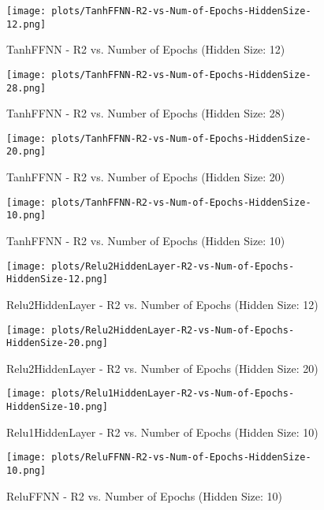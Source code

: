 
\begin{figure}[H]
    \centering
    \texttt{[image: plots/TanhFFNN-R2-vs-Num-of-Epochs-HiddenSize-12.png]}
    \caption{TanhFFNN - R2 vs. Number of Epochs (Hidden Size: 12)}
\end{figure}

\begin{figure}[H]
    \centering
    \texttt{[image: plots/TanhFFNN-R2-vs-Num-of-Epochs-HiddenSize-28.png]}
    \caption{TanhFFNN - R2 vs. Number of Epochs (Hidden Size: 28)}
\end{figure}

\begin{figure}[H]
    \centering
    \texttt{[image: plots/TanhFFNN-R2-vs-Num-of-Epochs-HiddenSize-20.png]}
    \caption{TanhFFNN - R2 vs. Number of Epochs (Hidden Size: 20)}
\end{figure}

\begin{figure}[H]
    \centering
    \texttt{[image: plots/TanhFFNN-R2-vs-Num-of-Epochs-HiddenSize-10.png]}
    \caption{TanhFFNN - R2 vs. Number of Epochs (Hidden Size: 10)}
\end{figure}

\begin{figure}[H]
    \centering
    \texttt{[image: plots/Relu2HiddenLayer-R2-vs-Num-of-Epochs-HiddenSize-12.png]}
    \caption{Relu2HiddenLayer - R2 vs. Number of Epochs (Hidden Size: 12)}
\end{figure}

\begin{figure}[H]
    \centering
    \texttt{[image: plots/Relu2HiddenLayer-R2-vs-Num-of-Epochs-HiddenSize-20.png]}
    \caption{Relu2HiddenLayer - R2 vs. Number of Epochs (Hidden Size: 20)}
\end{figure}

\begin{figure}[H]
    \centering
    \texttt{[image: plots/Relu1HiddenLayer-R2-vs-Num-of-Epochs-HiddenSize-10.png]}
    \caption{Relu1HiddenLayer - R2 vs. Number of Epochs (Hidden Size: 10)}
\end{figure}

\begin{figure}[H]
    \centering
    \texttt{[image: plots/ReluFFNN-R2-vs-Num-of-Epochs-HiddenSize-10.png]}
    \caption{ReluFFNN - R2 vs. Number of Epochs (Hidden Size: 10)}
\end{figure}

